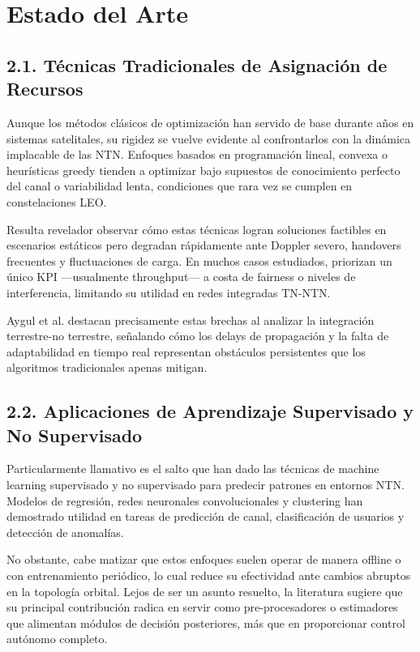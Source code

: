 \section{Estado del Arte}

\subsection{2.1. Técnicas Tradicionales de Asignación de Recursos}

Aunque los métodos clásicos de optimización han servido de base durante años en sistemas satelitales, su rigidez se vuelve evidente al confrontarlos con la dinámica implacable de las NTN. Enfoques basados en programación lineal, convexa o heurísticas greedy tienden a optimizar bajo supuestos de conocimiento perfecto del canal o variabilidad lenta, condiciones que rara vez se cumplen en constelaciones LEO. 

Resulta revelador observar cómo estas técnicas logran soluciones factibles en escenarios estáticos pero degradan rápidamente ante Doppler severo, handovers frecuentes y fluctuaciones de carga. En muchos casos estudiados, priorizan un único KPI —usualmente throughput— a costa de fairness o niveles de interferencia, limitando su utilidad en redes integradas TN-NTN. 

Aygul et al. \cite{Aygul2024} destacan precisamente estas brechas al analizar la integración terrestre-no terrestre, señalando cómo los delays de propagación y la falta de adaptabilidad en tiempo real representan obstáculos persistentes que los algoritmos tradicionales apenas mitigan.

\subsection{2.2. Aplicaciones de Aprendizaje Supervisado y No Supervisado}

Particularmente llamativo es el salto que han dado las técnicas de machine learning supervisado y no supervisado para predecir patrones en entornos NTN. Modelos de regresión, redes neuronales convolucionales y clustering han demostrado utilidad en tareas de predicción de canal, clasificación de usuarios y detección de anomalías. 

No obstante, cabe matizar que estos enfoques suelen operar de manera offline o con entrenamiento periódico, lo cual reduce su efectividad ante cambios abruptos en la topología orbital. Lejos de ser un asunto resuelto, la literatura sugiere que su principal contribución radica en servir como pre-procesadores o estimadores que alimentan módulos de decisión posteriores, más que en proporcionar control autónomo completo. 

